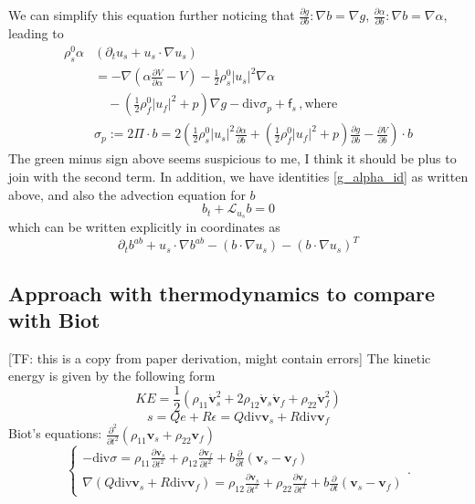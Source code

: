 \documentclass[12pt]{article}
\numberwithin{theorem}{section}
\newcommand{\pp}[2]{\frac{\partial #1}{\partial #2}}
\begin{document}
\begin{framed}
\begin{equation}
\label{solid_eq_0}
\end{equation} 
We can simplify this equation further noticing that $\pp{g}{b}: \nabla b= \nabla g$, $\pp{\alpha}{b}: \nabla b= \nabla \alpha$, leading to 
\begin{equation} 
\begin{aligned} 
\rho_s^0 \alpha & \left( \partial_t u_s + u_s \cdot \nabla u_s \right) 
\\& = 
-\nabla \left( \alpha \pp{V}{\alpha} -V \right) 
- \frac{1}{2} \rho_s^0  |u_s|^2 \nabla \alpha  
 \\& \quad 
 -\left(  \frac{1}{2} \rho_f^0  |u_f|^2 + p \right) \nabla g- \mbox{div} \sigma_p+ \mathsf{f}_s \,, \mbox{where} 
 \\ 
 & \sigma_p:= 2 \Pi \cdot b = 2 \left( \frac{1}{2} \rho_s^0  |u_s|^2 \pp{\alpha}{b} +\left(  \frac{1}{2} \rho_f^0  |u_f|^2 + p \right) \pp{g}{b} -\pp{V}{b} \right) \cdot b 
 \end{aligned} 
\label{solid_eq_1}
\end{equation} 
The green minus sign above seems suspicious to me, I think it should be plus to join with the second term. 
In addition, we have identities \eqref{g_alpha_id} as written above, and also the advection equation for $b$ 
\begin{equation} 
\label{b_eq} 
b_t + \mathcal{L}_{u_s} b = 0 
\end{equation} 
which can be written explicitly in coordinates as 
\begin{equation} 
\label{b_eq_explicit} 
\partial_t b^{ab} + u_s \cdot \nabla  b^{ab} - \left(b \cdot \nabla u_s\right) - \left( b \cdot \nabla u_s \right)^T 
\end{equation} 
\color{black}
\end{framed}

\subsection{Approach with thermodynamics to compare with Biot}
[TF: this is a copy from paper derivation, might contain errors]
The kinetic energy is given by the following form
\[KE = \frac12(\rho_{11}\dot{\mathbf{v}}_s^2+2\rho_{12}\dot{\mathbf{v}}_s\dot{\mathbf{v}}_f+\rho_{22}\dot{\mathbf{v}}_f^2)\]
\[s=Qe+R\epsilon = Q\mathrm{div}\mathbf{v}_s+R\mathrm{div}\mathbf{v}_f\]
Biot's equations: $\frac{\partial^2}{\partial t^2}(\rho_{11}\mathbf{v}_s+\rho_{22}\mathbf{v}_f)$
\[\left\{\begin{array}{l}
-\mathrm{div}\sigma = \rho_{11}\frac{\partial \mathbf{v}_s}{\partial t^2}+\rho_{12}\frac{\partial \mathbf{v}_f}{\partial t^2} + b\frac\partial{\partial t}(\mathbf{v}_s-\mathbf{v}_f) \\
\nabla (Q\mathrm{div}\mathbf{v}_s+R\mathrm{div}\mathbf{v}_f)=\rho_{12}\frac{\partial \mathbf{v}_s}{\partial t^2}+\rho_{22}\frac{\partial \mathbf{v}_f}{\partial t^2} + b\frac\partial{\partial t}(\mathbf{v}_s-\mathbf{v}_f) 
\end{array}\right..\]
\end{document}
